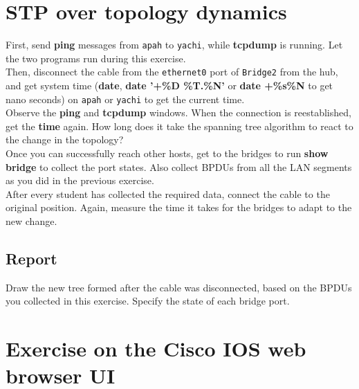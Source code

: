 \documentclass[10pt,a4paper]{article}
\numberwithin{equation}{section}
\numberwithin{figure}{section}
\numberwithin{table}{section}
\begin{document}
\section{STP over topology dynamics}
    First, send \textbf{ping} messages from \texttt{apah} to \texttt{yachi}, while \textbf{tcpdump} is running.
    Let the two programs run during this exercise. \\
    Then, disconnect the cable from the \texttt{ethernet0} port of \texttt{Bridge2} from the hub, and get system time (\textbf{date}, \textbf{date '+\%D \%T.\%N'} or \textbf{date +\%s\%N} to get nano seconds) on \texttt{apah} or \texttt{yachi} to get the current time. \\
    Observe the \textbf{ping} and \textbf{tcpdump} windows. When the connection is reestablished, get the \textbf{time} again. How long does it take the spanning tree algorithm to react to the change in the topology? \\
    Once you can successfully reach other hosts, get to the bridges to run \textbf{show bridge} to collect the port states. Also collect BPDUs from all the LAN segments as you did in the previous exercise. \\
    After every student has collected the required data, connect the cable to the original position. Again, measure the time it takes for the bridges to adapt to the new change.
    \subsection*{Report}
    Draw the new tree formed after the cable was disconnected, based on the BPDUs you collected in this exercise. Specify the state of each bridge port.

    \section*{Exercise on the Cisco IOS web browser UI}
\end{document}
